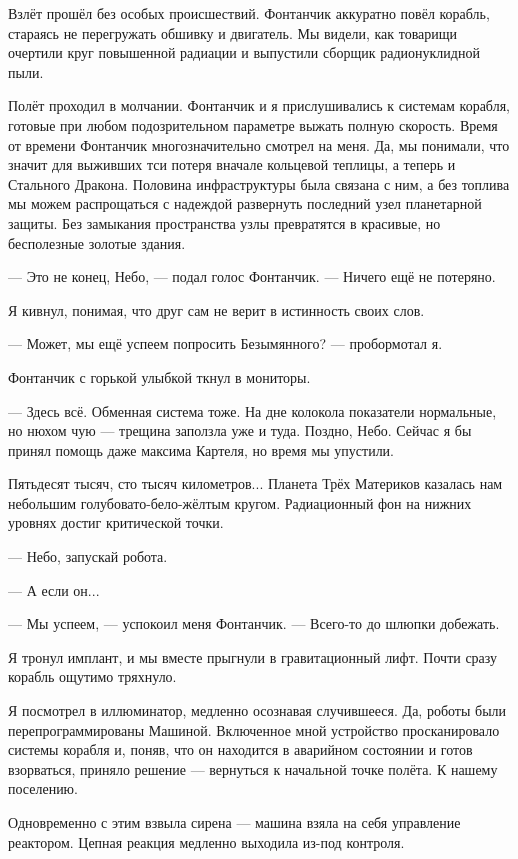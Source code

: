 Взлёт прошёл без особых происшествий.
Фонтанчик аккуратно повёл корабль, стараясь не перегружать обшивку и двигатель.
Мы видели, как товарищи очертили круг повышенной радиации и выпустили сборщик радионуклидной пыли.

Полёт проходил в молчании.
Фонтанчик и я прислушивались к системам корабля, готовые при любом подозрительном параметре выжать полную скорость.
Время от времени Фонтанчик многозначительно смотрел на меня.
Да, мы понимали, что значит для выживших тси потеря вначале кольцевой теплицы, а теперь и Стального Дракона.
Половина инфраструктуры была связана с ним, а без топлива мы можем распрощаться с надеждой развернуть последний узел планетарной защиты.
Без замыкания пространства узлы превратятся в красивые, но бесполезные золотые здания.

--- Это не конец, Небо, --- подал голос Фонтанчик.
--- Ничего ещё не потеряно.

Я кивнул, понимая, что друг сам не верит в истинность своих слов.

--- Может, мы ещё успеем попросить Безымянного? --- пробормотал я.

Фонтанчик с горькой улыбкой ткнул в мониторы.

--- Здесь всё.
Обменная система тоже.
На дне колокола показатели нормальные, но нюхом чую --- трещина заползла уже и туда.
Поздно, Небо.
Сейчас я бы принял помощь даже максима Картеля, но время мы упустили.

Пятьдесят тысяч, сто тысяч километров...
Планета Трёх Материков казалась нам небольшим голубовато-бело-жёлтым кругом.
Радиационный фон на нижних уровнях достиг критической точки.

--- Небо, запускай робота.

--- А если он...

--- Мы успеем, --- успокоил меня Фонтанчик.
--- Всего-то до шлюпки добежать.

Я тронул имплант, и мы вместе прыгнули в гравитационный лифт.
Почти сразу корабль ощутимо тряхнуло.

Я посмотрел в иллюминатор, медленно осознавая случившееся.
Да, роботы были перепрограммированы Машиной.
Включенное мной устройство просканировало системы корабля и, поняв, что он находится в аварийном состоянии и готов взорваться, приняло решение --- вернуться к начальной точке полёта.
К нашему поселению.

Одновременно с этим взвыла сирена --- машина взяла на себя управление реактором.
Цепная реакция медленно выходила из-под контроля.

